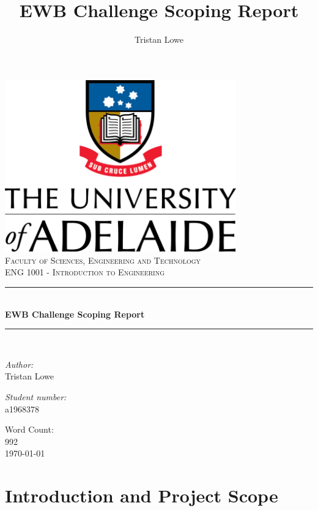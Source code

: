 \documentclass[a4paper,12pt]{report}
\author{Tristan Lowe}
\title{EWB Challenge Scoping Report}
\newcommand{\HRule}{\rule{\linewidth}{0.5mm}}
\begin{document}
\setlength{\parskip}{6pt}

\begin{titlepage}
\begin{center}
\includegraphics[width=0.75\textwidth]{./UoA.png}\\[1.0cm]    
\textsc{\LARGE Faculty of Sciences, Engineering and Technology}\\[1.0cm]
\textsc{\Large ENG 1001 - Introduction to Engineering}\\[0.5cm]
\HRule \\[0.4cm]
{ \huge \bfseries EWB Challenge Scoping Report}\\[0.4cm]
\HRule \\[0.4cm]
\begin{minipage}{0.4\textwidth}
\begin{flushleft} \large
\emph{Author:}\\
Tristan Lowe
\end{flushleft}
\end{minipage}
\begin{minipage}{0.4\textwidth}
\begin{flushright} \large
\emph{Student number:} \\
a1968378
\end{flushright}
\end{minipage}
\vfill
Word Count:\\
992\\[0.4cm]
{\large \today}
\end{center}
\end{titlepage}

\tableofcontents
\newpage

\setcounter{chapter}{1}
\renewcommand{\thesection}{\arabic{section}}

\section{Introduction and Project Scope}
\end{document}
